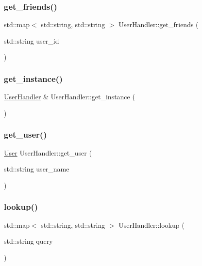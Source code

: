 \subsubsection{\texorpdfstring{get\+\_\+friends()}{get\_friends()}}
{\footnotesize\ttfamily std\+::map$<$ std\+::string, std\+::string $>$ User\+Handler\+::get\+\_\+friends (\begin{DoxyParamCaption}\item[{std\+::string}]{user\+\_\+id }\end{DoxyParamCaption})}

\mbox{\label{classUserHandler_ac4f67acbcfe4262169243a11f677a337}} 
\subsubsection{\texorpdfstring{get\+\_\+instance()}{get\_instance()}}
{\footnotesize\ttfamily \hyperlink{classUserHandler}{User\+Handler} \& User\+Handler\+::get\+\_\+instance (\begin{DoxyParamCaption}{ }\end{DoxyParamCaption})\hspace{0.3cm}{\ttfamily [static]}}

\mbox{\label{classUserHandler_a89c1cf91efd6184a41368cdbd59f7908}} 
\subsubsection{\texorpdfstring{get\+\_\+user()}{get\_user()}}
{\footnotesize\ttfamily \hyperlink{classUser}{User} User\+Handler\+::get\+\_\+user (\begin{DoxyParamCaption}\item[{std\+::string}]{user\+\_\+name }\end{DoxyParamCaption})}

\mbox{\label{classUserHandler_a970aeeb9a856f5413a0759f26d540a93}} 
\subsubsection{\texorpdfstring{lookup()}{lookup()}}
{\footnotesize\ttfamily std\+::map$<$ std\+::string, std\+::string $>$ User\+Handler\+::lookup (\begin{DoxyParamCaption}\item[{std\+::string}]{query }\end{DoxyParamCaption})}

